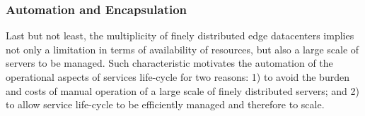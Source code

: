 
	
\subsubsection*{Automation and Encapsulation}


Last but not least, the multiplicity of finely distributed edge datacenters implies not only a limitation in terms of availability of resources, but also a large scale of servers to be managed. Such characteristic motivates the automation of the operational aspects of services life-cycle for two reasons: 1) to avoid the burden and costs of manual operation of a large scale of finely distributed servers; and 2) to allow service life-cycle to be efficiently managed and therefore to scale. 





